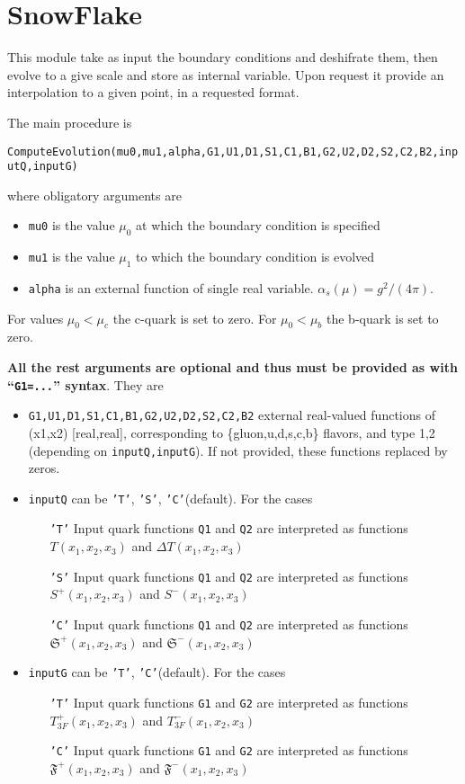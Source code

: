 \documentclass[prd,nofootinbib,eqsecnum,final]{revtex4}
\renewcommand{\(}{\left(}
\renewcommand{\)}{\right)}
\renewcommand{\[}{\left[}
\renewcommand{\]}{\right]}
\newcommand{\red}[1]{{\color[rgb]{1,0,0} #1}}
\begin{document}
\section{SnowFlake}

This module take as input the boundary conditions and deshifrate them, then evolve to a give scale and store as internal variable. Upon request it provide an interpolation to a given point, in a requested format.

The main procedure is 
\begin{center}
\texttt{ComputeEvolution(mu0,mu1,alpha,G1,U1,D1,S1,C1,B1,G2,U2,D2,S2,C2,B2,inputQ,inputG)}
\end{center}
 where obligatory arguments are
\begin{itemize}
\item \texttt{mu0} is the value $\mu_0$ at which the boundary condition is specified
\item \texttt{mu1} is the value $\mu_1$ to which the boundary condition is evolved
\item \texttt{alpha} is an external function of single real variable. $\alpha_s(\mu)=g^2/(4\pi)$.
\end{itemize}
For values $\mu_0<\mu_c$ the c-quark is set to zero. For $\mu_0<\mu_b$ the b-quark is set to zero. 

\textbf{All the rest arguments are optional and thus must be provided as with ``\texttt{G1=...}'' syntax}. They are
\begin{itemize}
\item \texttt{G1,U1,D1,S1,C1,B1,G2,U2,D2,S2,C2,B2} external real-valued functions of (x1,x2) [real,real], corresponding to \{gluon,u,d,s,c,b\} flavors, and type 1,2 (depending on \texttt{inputQ,inputG}). \red{If not provided, these functions replaced by zeros.}
\item \texttt{inputQ} can be \texttt{'T'}, \texttt{'S'}, \texttt{'C'}(default). For the cases
\begin{itemize}
\item[\texttt{'T'}] Input quark functions \texttt{Q1} and \texttt{Q2} are interpreted as functions $T(x_1,x_2,x_3)$ and $\Delta T(x_1,x_2,x_3)$
\item[\texttt{'S'}] Input quark functions \texttt{Q1} and \texttt{Q2} are interpreted as functions $S^+(x_1,x_2,x_3)$ and $S^-(x_1,x_2,x_3)$
\item[\texttt{'C'}] Input quark functions \texttt{Q1} and \texttt{Q2} are interpreted as functions $\mathfrak{S}^+(x_1,x_2,x_3)$ and $\mathfrak{S}^-(x_1,x_2,x_3)$
\end{itemize}
\item \texttt{inputG} can be \texttt{'T'}, \texttt{'C'}(default). For the cases
\begin{itemize}
\item[\texttt{'T'}] Input quark functions \texttt{G1} and \texttt{G2} are interpreted as functions $T^+_{3F}(x_1,x_2,x_3)$ and $T^-_{3F}(x_1,x_2,x_3)$
\item[\texttt{'C'}] Input quark functions \texttt{G1} and \texttt{G2} are interpreted as functions $\mathfrak{F}^+(x_1,x_2,x_3)$ and $\mathfrak{F}^-(x_1,x_2,x_3)$
\end{itemize}
\end{itemize}
\end{document}
